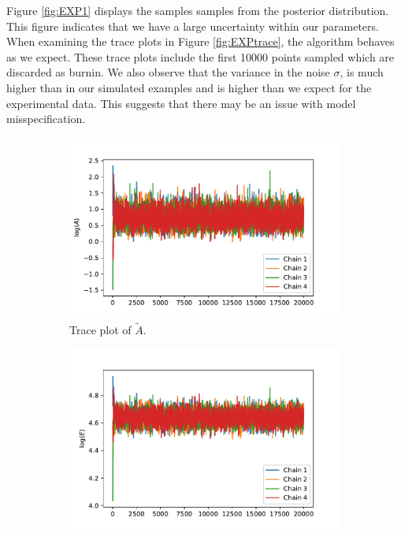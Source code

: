 Figure \ref{fig:EXP1} displays the samples samples from the posterior distribution. This figure indicates that we have a large uncertainty within our parameters. When examining the trace plots in Figure \ref{fig:EXPtrace}, the algorithm behaves as we expect. These trace plots include the first 10000 points sampled which are discarded as burnin. We also observe that the variance in the noise $\sigma$, is much higher than in our simulated examples and is higher than we expect for the experimental data. This suggests that there may be an issue with model misspecification.\\

\begin{figure}[h!]
\centering
\begin{subfigure}{.5\textwidth}
  \centering
  \includegraphics[width=\linewidth]{figures/bayesian/1_reaction/EXP/trace_plot_A.pdf}
  \caption{Trace plot of $\tilde{A}$.}
  \label{fig:1EXPA}
\end{subfigure}%
\begin{subfigure}{.5\textwidth}
  \centering
  \includegraphics[width=\linewidth]{figures/bayesian/1_reaction/EXP/trace_plot_E.pdf}

\end{subfigure}
\end{figure}
